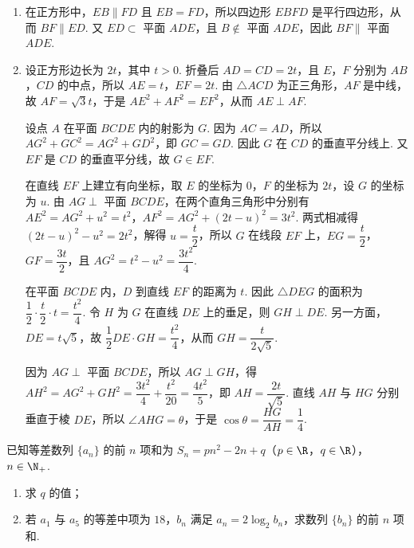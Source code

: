 \begin{solution}
\begin{enumerate}
\item 在正方形中，\(EB\parallel FD\) 且 \(EB=FD\)，所以四边形 \(EBFD\) 是平行四边形，从而 \(BF\parallel ED\). 又 \(ED\subset\) 平面 \(ADE\)，且 \(B\notin\) 平面 \(ADE\)，因此 \(BF\parallel\) 平面 \(ADE\).
\item 设正方形边长为 \(2t\)，其中 \(t>0\). 折叠后 \(AD=CD=2t\)，且 \(E\)，\(F\) 分别为 \(AB\)，\(CD\) 的中点，所以 \(AE=t\)，\(EF=2t\). 由 \(\triangle ACD\) 为正三角形，\(AF\) 是中线，故 \(AF=\sqrt3t\)，于是 \(AE^2+AF^2=EF^2\)，从而 \(AE\perp AF\).

设点 \(A\) 在平面 \(BCDE\) 内的射影为 \(G\). 因为 \(AC=AD\)，所以 \(AG^2+GC^2=AG^2+GD^2\)，即 \(GC=GD\). 因此 \(G\) 在 \(CD\) 的垂直平分线上. 又 \(EF\) 是 \(CD\) 的垂直平分线，故 \(G\in EF\).

在直线 \(EF\) 上建立有向坐标，取 \(E\) 的坐标为 \(0\)，\(F\) 的坐标为 \(2t\)，设 \(G\) 的坐标为 \(u\). 由 \(AG\perp\) 平面 \(BCDE\)，在两个直角三角形中分别有 \(AE^2=AG^2+u^2=t^2\)，\(AF^2=AG^2+(2t-u)^2=3t^2\). 两式相减得 \((2t-u)^2-u^2=2t^2\)，解得 \(u=\dfrac{t}{2}\)，所以 \(G\) 在线段 \(EF\) 上，\(EG=\dfrac{t}{2}\)，\(GF=\dfrac{3t}{2}\)，且 \(AG^2=t^2-u^2=\dfrac{3t^2}{4}\).

在平面 \(BCDE\) 内，\(D\) 到直线 \(EF\) 的距离为 \(t\). 因此 \(\triangle DEG\) 的面积为 \(\dfrac12\cdot\dfrac{t}{2}\cdot t=\dfrac{t^2}{4}\). 令 \(H\) 为 \(G\) 在直线 \(DE\) 上的垂足，则 \(GH\perp DE\). 另一方面，\(DE=t\sqrt5\)，故 \(\dfrac12DE\cdot GH=\dfrac{t^2}{4}\)，从而 \(GH=\dfrac{t}{2\sqrt5}\).

因为 \(AG\perp\) 平面 \(BCDE\)，所以 \(AG\perp GH\)，得 \(AH^2=AG^2+GH^2=\dfrac{3t^2}{4}+\dfrac{t^2}{20}=\dfrac{4t^2}{5}\)，即 \(AH=\dfrac{2t}{\sqrt5}\). 直线 \(AH\) 与 \(HG\) 分别垂直于棱 \(DE\)，所以 \(\angle AHG=\theta\)，于是 \(\cos\theta=\dfrac{HG}{AH}=\dfrac14\).
\end{enumerate}
\end{solution}

\begin{problem}
已知等差数列 \(\{a_{n}\}\) 的前 \(n\) 项和为 \(S_{n} = pn^{2} - 2n + q\)（\(p\in\R\)，\(q\in\R\)），\(n \in \N_{+}\).

\begin{enumerate}
\item 求 \(q\) 的值；
\item 若 \( a_{1} \) 与 \( a_{5} \) 的等差中项为 \(18\)，\( b_{n} \) 满足 \( a_{n} = 2 \log_{2} b_{n} \)，求数列 \(\{b_n\}\) 的前 \(n\) 项和.
\end{enumerate}
\end{problem}

